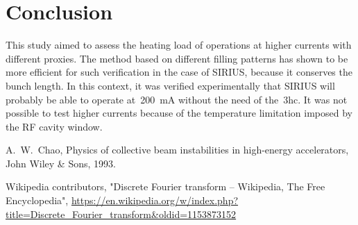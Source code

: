 \documentclass
[
    a4paper,
]{jacow}
\begin{document}
\section{Conclusion}

This study aimed to assess the heating load of operations at higher currents with different proxies. The method based on different filling patterns has shown to be more efficient for such verification in the case of SIRIUS, because it conserves the bunch length. In this context, it was verified experimentally that SIRIUS will probably be able to operate at~\SI{200}{\milli\ampere} without the need of the~\gls{3hc}. It was not possible to test higher currents because of the temperature limitation imposed by the RF cavity window.
%
%
%
{\printbibliography}%
{%

    \begin{thebibliography}{9} %

        A.~W.~Chao,
        Physics of collective beam instabilities in high-energy accelerators,
        John Wiley \& Sons, 1993.
        
        Wikipedia contributors,
        "Discrete Fourier transform -- Wikipedia, The Free Encyclopedia",
        \url{https://en.wikipedia.org/w/index.php?title=Discrete_Fourier_transform&oldid=1153873152}
    \end{thebibliography}
} %
\end{document}
